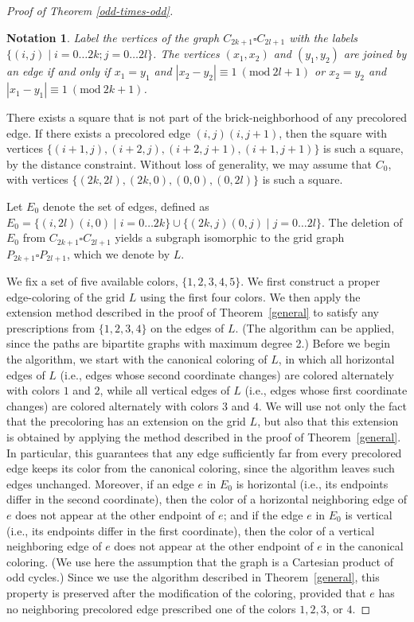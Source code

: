\documentclass[a4paper,12pt]{article}
\newcommand{\Mod}[1]{\ (\mathrm{mod}\ #1)}
\newtheorem{nota}[theorem]{\bf Notation}
\begin{document}
\begin{proof}[Proof of Theorem \ref{odd-times-odd}]

    \begin{nota}
        \textup{Label the vertices of the graph $C_{2k+1} \square C_{2l+1}$ with the labels $\{(i,j) \mid i=0 \dots 2k; j=0 \dots 2l\}$. The vertices $(x_1,x_2)$ and $(y_1,y_2)$ are joined by an edge if and only if $x_1=y_1$ and $|x_2-y_2| \equiv 1 \Mod{2l+1}$ or $x_2=y_2$ and $|x_1-y_1| \equiv 1 \Mod{2k+1}$.}
    \end{nota}

    There exists a square that is not part of the brick-neighborhood of any precolored edge. If there exists a precolored edge $(i,j)(i,j+1)$, then the square with vertices $\{(i+1,j), (i+2,j), (i+2,j+1), (i+1,j+1) \}$ is such a square, by the distance constraint. Without loss of generality, we may assume that $C_0$, with vertices $\{ (2k,2l), (2k,0), (0,0), (0,2l)\}$ is such a square.

    Let $E_0$ denote the set of edges, defined as $E_0 = \{(i,2l)(i,0) \mid i=0 \dots 2k\} \cup \{(2k,j)(0,j) \mid j=0 \dots 2l\}$. The deletion of $E_0$ from $C_{2k+1} \square C_{2l+1}$ yields a subgraph isomorphic to the grid graph $P_{2k+1} \square P_{2l+1}$, which we denote by $L$.

    We fix a set of five available colors, $\{1, 2, 3, 4, 5\}$. We first construct a proper edge-coloring of the grid $L$ using the first four colors. We then apply the extension method described in the proof of Theorem~\ref{general} to satisfy any prescriptions from $\{1, 2, 3, 4\}$ on the edges of $L$. (The algorithm can be applied, since the paths are bipartite graphs with maximum degree 2.) Before we begin the algorithm, we start with the canonical coloring of $L$, in which all horizontal edges of $L$ (i.e., edges whose second coordinate changes) are colored alternately with colors $1$ and $2$, while all vertical edges of $L$ (i.e., edges whose first coordinate changes) are colored alternately with colors $3$ and $4$. We will use not only the fact that the precoloring has an extension on the grid $L$, but also that this extension is obtained by applying the method described in the proof of Theorem~\ref{general}. In particular, this guarantees that any edge sufficiently far from every precolored edge keeps its color from the canonical coloring, since the algorithm leaves such edges unchanged. Moreover, if an edge $e$ in $E_0$ is horizontal (i.e., its endpoints differ in the second coordinate), then the color of a horizontal neighboring edge of $e$ does not appear at the other endpoint of $e$; and if the edge $e$ in $E_0$ is vertical (i.e., its endpoints differ in the first coordinate), then the color of a vertical neighboring edge of $e$ does not appear at the other endpoint of $e$ in the canonical coloring. (We use here the assumption that the graph is a Cartesian product of odd cycles.) Since we use the algorithm described in Theorem~\ref{general}, this property is preserved after the modification of the coloring, provided that $e$ has no neighboring precolored edge prescribed one of the colors $1, 2, 3$, or $4$.


\end{proof}
\end{document}
